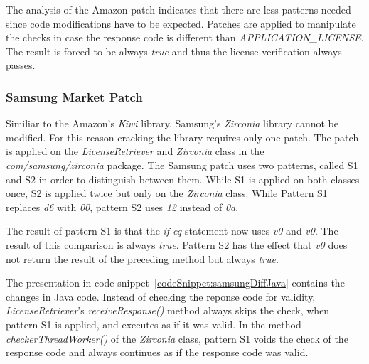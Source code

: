 The analysis of the Amazon patch indicates that there are less patterns needed since code modifications have to be expected.
Patches are applied to manipulate the checks in case the response code is different than \textit{APPLICATION\_LICENSE}.
The result is forced to be always \textit{true} and thus the license verification always passes.


\subsubsection{Samsung Market Patch}
Similiar to the Amazon's \textit{Kiwi} library, Samsung's \textit{Zirconia} library cannot be modified.
For this reason cracking the library requires only one patch.
The patch is applied on the \textit{LicenseRetriever} and \textit{Zirconia} class in the \textit{com/samsung/zirconia} package.
The Samsung patch uses two patterns, called S1 and S2 in order to distinguish between them.
While S1 is applied on both classes once, S2 is applied twice but only on the \textit{Zirconia} class.
\newline
While Pattern S1 replaces \textit{d6} with \textit{00}, pattern S2 uses \textit{12} instead of \textit{0a}.
\newline

The result of pattern S1 is that the \textit{if-eq} statement now uses \textit{v0} and \textit{v0}.
The result of this comparison is always \textit{true}.
Pattern S2 has the effect that \textit{v0} does not return the result of the preceding method but always \textit{true}.
\newline

The presentation in code snippet~\ref{codeSnippet:samsungDiffJava} contains the changes in Java code.
Instead of checking the reponse code for validity, \textit{LicenseRetriever}'s \textit{receiveResponse()} method always skips the check, when pattern S1 is applied, and executes as if it was valid.
In the method \textit{checkerThreadWorker()} of the \textit{Zirconia} class, pattern S1 voids the check of the response code and always continues as if the response code was valid.
\newline
